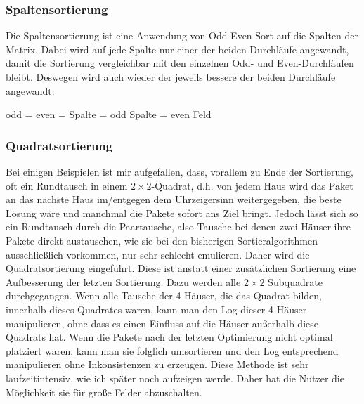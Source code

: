 \documentclass[12pt]{article}
\begin{document}
\subsubsection{Spaltensortierung}
Die Spaltensortierung ist eine Anwendung von Odd-Even-Sort auf die Spalten der Matrix. Dabei wird auf jede Spalte nur einer der beiden Durchläufe angewandt, damit die Sortierung vergleichbar mit den einzelnen Odd- und Even-Durchläufen bleibt. Deswegen wird auch wieder der jeweils bessere der beiden Durchläufe angewandt:
\begin{algorithmic}
		\State odd = 
		\State even = 
			\State Spalte = odd
		\Else
			\State Spalte = even
		\EndIf
	\EndFor 
	\State \Return Feld
 \EndProcedure
\end{algorithmic}

\subsubsection{Quadratsortierung}
Bei einigen Beispielen ist mir aufgefallen, dass, vorallem zu Ende der Sortierung, oft ein Rundtausch in einem $2\times2$-Quadrat, d.h. von jedem Haus wird das Paket an das nächste Haus im/entgegen dem Uhrzeigersinn weitergegeben, die beste Lösung wäre und manchmal die Pakete sofort ans Ziel bringt. Jedoch lässt sich so ein Rundtausch durch die Paartausche, also Tausche bei denen zwei Häuser ihre Pakete direkt austauschen, wie sie bei den bisherigen Sortieralgorithmen ausschließlich vorkommen, nur sehr schlecht emulieren. Daher wird die Quadratsortierung eingeführt. Diese ist anstatt einer zusätzlichen Sortierung eine Aufbesserung der letzten Sortierung. Dazu werden alle $2\times2$ Subquadrate durchgegangen. Wenn alle Tausche der 4 Häuser, die das Quadrat bilden, innerhalb dieses Quadrates waren, kann man den Log dieser 4 Häuser manipulieren, ohne dass es einen Einfluss auf die Häuser außerhalb diese Quadrats hat. Wenn die Pakete nach der letzten Optimierung nicht optimal platziert waren, kann man sie folglich umsortieren und den Log entsprechend manipulieren ohne Inkonsistenzen zu erzeugen. Diese Methode ist sehr laufzeitintensiv, wie ich später noch aufzeigen werde. Daher hat die Nutzer die Möglichkeit sie für große Felder abzuschalten.
\end{document}
